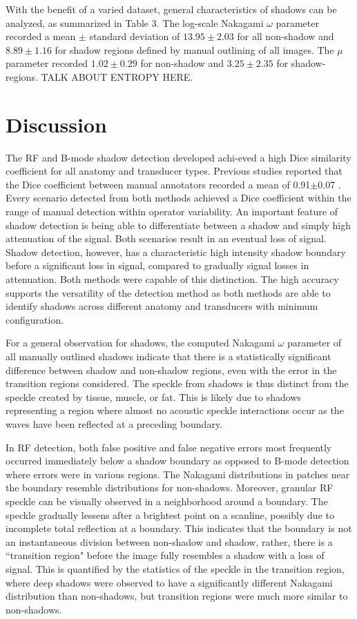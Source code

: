 \documentclass[preprint,5p,authoryear]{elsarticle}
\begin{document}
With the benefit of a varied dataset, general characteristics of shadows can be analyzed, as summarized in Table 3. The log-scale Nakagami $\omega$ parameter recorded a mean $\pm$ standard deviation of $13.95\pm2.03$ for all non-shadow and $8.89\pm1.16$ for shadow regions defined by manual outlining of all images. The $\mu$ parameter recorded $1.02\pm0.29$ for non-shadow and $3.25\pm2.35$ for shadow-regions.  TALK ABOUT ENTROPY HERE.


\section*{Discussion}
\label{Discuss}
The RF and B-mode shadow detection developed achi-eved a high Dice similarity coefficient for all anatomy and transducer types. Previous studies reported that the Dice coefficient between manual annotators recorded a mean of 0.91$\pm$0.07 \citep{Hellier2010}. Every scenario detected from both methods achieved a Dice coefficient within the range of manual detection within operator variability. An important feature of shadow detection is being able to differentiate between a shadow and simply high attenuation of the signal. Both scenarios result in an eventual loss of signal. Shadow detection, however, has a characteristic high intensity shadow boundary before a significant loss in signal, compared to gradually signal losses in attenuation. Both methods were capable of this distinction. The high accuracy supports the versatility of the detection method as both methods are able to identify shadows across different anatomy and transducers with minimum configuration. 

For a general observation for shadows, the computed Nakagami $\omega$ parameter of all manually outlined shadows indicate that there is a statistically significant difference between shadow and non-shadow regions, even with the error in the transition regions considered. The speckle from shadows is thus distinct from the speckle created by tissue, muscle, or fat. This is likely due to shadows representing a region where almost no acoustic speckle interactions occur as the waves have been reflected at a preceding boundary.  


In RF detection, both false positive and false negative errors most frequently occurred immediately below a shadow boundary as opposed to B-mode detection where errors were in various regions. The Nakagami distributions in patches near the boundary resemble distributions for non-shadows. Moreover,  granular RF speckle can be visually observed in a neighborhood around a boundary. The speckle gradually lessens after a brightest point on a scanline, possibly due to incomplete total reflection at a boundary. This indicates that the boundary is not an instantaneous division between non-shadow and shadow, rather, there is a ``transition region" before the image fully resembles a shadow with a loss of signal. This is quantified by the statistics of the speckle in the transition region, where deep shadows were observed to have a significantly different Nakagami distribution than non-shadows, but transition regions were much more similar to non-shadows.
\end{document}
